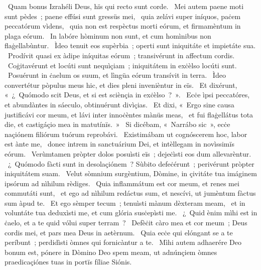 ~Quam bonus Izrahéli Deus, hïs qui recto sunt corde. 
~Mei autem paene moti sunt pèdes~; paene effúsi sunt gressüs mei, 
~quia zelávi super iníquos, paċem peccatórum vìdens, 
~quia non est respèctus morti eórum, et firmamèntum in plaga eórum. 
~In labóre hòminum non sunt, et cum homìnibus non flaġellabùntur. 
~Ìdeo tenuit eos supèrbia~; operti sunt iniquitáte et impietáte sua. 
~Prodívit quasi ex àdipe iníquitas eórum~; transivérunt in affectum cordis. 
~Coġitavérunt et locúti sunt nequìçiam~; iniquitátem in exċèlso locúti sunt. 
~Posuérunt in ċaelum os suum, et lìngüa eórum transívit in terra. 
~Ìdeo convertétur pòpulus meus hic, et dies pleni invenièntur in eïs. 
~Et dixérunt, «~¿~Quómodo scit Deus, et si est sciènçia in exċèlso~?~». 
~Ecċe ìpsi peccatóres, et abundàntes in sáeculo, obtinuérunt divìçias. 
~Et dixi, «~Ergo sine causa justificávi cor meum, et lávi inter innoċèntes mànüs meas, 
~et fui flaġellátus tota die, et castigáçio mea in matutínïs.~»
~Si dicébam, «~Narrábo sic~», ecċe naçiónem filiórum tuórum reprobávi. 
~Existimábam ut cognóscerem hoc, labor est ànte me, 
~donec intrem in sanctuárium Dei, et intèllegam in novìssimïs eórum. 
~Verùmtamen pròpter dolos posuìsti eïs~; dejeċìsti eos dum allevarèntur. 
~¿~Quómodo fàcti sunt in desolaçiónem~? Sùbito defeċérunt~; perivérunt pròpter iniquitátem suam. 
~Velut sòmnium surgèntium, Dòmine, in çivitáte tua imáginem ipsórum ad nìhilum rèdiges. 
~Quia inflammátum est cor meum, et renes mei commutáti sunt, 
~et ego ad nìhilum redáctus sum, et nescívi, ut jumèntum fàctus sum àpud te. 
~Et ego sèmper tecum~; tenuìsti mànum dèxteram meam, 
~et in voluntáte tua deduxìsti me, et cum glória susċepìsti me. 
~¿~Quid ènim mìhi est in ċaelo, et a te quid vólui super terram~? 
~Defèċit càro mea et cor meum~; Deus cordis mei, et pars mea Deus in aetèrnum. 
~Quia ecċe qui elóngant se a te períbunt~; perdidìsti òmnes qui fornicàntur a te. 
~Mìhi autem adhaerére Deo bonum est, pónere in Dòmino Deo spem meam, ut adnúnçiem òmnes praedicaçiónes tuas in portïs fíliae Siónis. 
